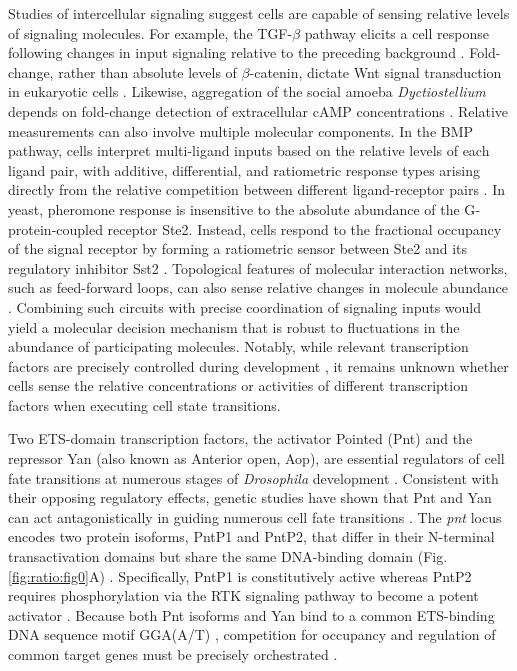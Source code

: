 Studies of intercellular signaling suggest cells are capable of sensing relative levels of signaling molecules. For example, the TGF-$\beta$ pathway elicits a cell response following changes in input signaling relative to the preceding background \cite{Frick2017}. Fold-change, rather than absolute levels of $\beta$-catenin, dictate Wnt signal transduction in eukaryotic cells \cite{Goentoro2009a}. Likewise, aggregation of the social amoeba \textit{Dyctiostellium} depends on fold-change detection of extracellular cAMP concentrations \cite{Kamino2017}. Relative measurements can also involve multiple molecular components. In the BMP pathway, cells interpret multi-ligand inputs based on the relative levels of each ligand pair, with additive, differential, and ratiometric response types arising directly from the relative competition between different ligand-receptor pairs \cite{Antebi2017}. In yeast, pheromone response is insensitive to the absolute abundance of the G‐protein‐coupled receptor Ste2. Instead, cells respond to the fractional occupancy of the signal receptor by forming a ratiometric sensor between Ste2 and its regulatory inhibitor Sst2 \cite{Bush2016}. Topological features of molecular interaction networks, such as feed-forward loops, can also sense relative changes in molecule abundance \cite{Goentoro2009,Adler2018}. Combining such circuits with precise coordination of signaling inputs would yield a molecular decision mechanism that is robust to fluctuations in the abundance of participating molecules. Notably, while relevant transcription factors are precisely controlled during development \cite{Doe2017,Erclik2017}, it remains unknown whether cells sense the relative concentrations or activities of different transcription factors when executing cell state transitions.

Two ETS-domain transcription factors, the activator Pointed (Pnt) and the repressor Yan (also known as Anterior open, Aop), are essential regulators of cell fate transitions at numerous stages of \textit{Drosophila} development \cite{Gabay1996,Halfon2000,Morimoto1996,Xu2000,Flores2000}. Consistent with their opposing regulatory effects, genetic studies have shown that Pnt and Yan can act antagonistically in guiding numerous cell fate transitions \cite{Brunner1994,ONeill1994a,Gabay1996,Halfon2000}. The \textit{pnt} locus encodes two protein isoforms, PntP1 and PntP2, that differ in their N-terminal transactivation domains but share the same DNA-binding domain (Fig. \ref{fig:ratio:fig0}A) \cite{Klambt1993,Scholz1993}. Specifically, PntP1 is constitutively active whereas PntP2 requires phosphorylation via the RTK signaling pathway to become a potent activator \cite{ONeill1994a,Brunner1994}. Because both Pnt isoforms and Yan bind to a common ETS-binding DNA sequence motif GGA(A/T) \cite{Wei2010}, competition for occupancy and regulation of common target genes must be precisely orchestrated \cite{ONeill1994a,Halfon2000,Flores2000,Xu2000,Webber2013,Webber2013a,BoisclairLachance2018,Webber2018}.

